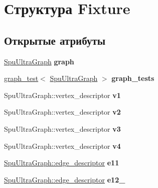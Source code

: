 \hypertarget{struct_fixture}{}\section{Структура Fixture}
\label{struct_fixture}
\subsection*{Открытые атрибуты}
\begin{DoxyCompactItemize}
\item 
\mbox{\label{struct_fixture_a13638f842ef2a8714421ebe71ba98a39}} 
\hyperlink{class_s_p_u___g_r_a_p_h_1_1_spu_ultra_graph}{Spu\+Ultra\+Graph} {\bfseries graph}
\item 
\mbox{\label{struct_fixture_a34b974dcb43215b8dfbc776ecccebc9c}} 
\hyperlink{structboost_1_1graph__test}{graph\+\_\+test}$<$ \hyperlink{class_s_p_u___g_r_a_p_h_1_1_spu_ultra_graph}{Spu\+Ultra\+Graph} $>$ {\bfseries graph\+\_\+tests}
\item 
\mbox{\label{struct_fixture_a27efb5204a9c0630f2f5371ed3492943}} 
Spu\+Ultra\+Graph\+::vertex\+\_\+descriptor {\bfseries v1}
\item 
\mbox{\label{struct_fixture_a574b245731c52555d692fa0c131489e2}} 
Spu\+Ultra\+Graph\+::vertex\+\_\+descriptor {\bfseries v2}
\item 
\mbox{\label{struct_fixture_a2f6bbeb63ad01ed7bf7daddd4c73a642}} 
Spu\+Ultra\+Graph\+::vertex\+\_\+descriptor {\bfseries v3}
\item 
\mbox{\label{struct_fixture_a14f9d6ac754e374afc2bd033b052f8ba}} 
Spu\+Ultra\+Graph\+::vertex\+\_\+descriptor {\bfseries v4}
\item 
\mbox{\label{struct_fixture_af62f86e186965f464151593a98320f0d}} 
\hyperlink{class_s_p_u___g_r_a_p_h_1_1_spu_ultra_graph_a5f3776e003ef0a1648f1d9f84289810b}{Spu\+Ultra\+Graph\+::edge\+\_\+descriptor} {\bfseries e11}
\item 
\mbox{\label{struct_fixture_a06aca3fe72ad21faab56f183ecbdd17c}} 
\hyperlink{class_s_p_u___g_r_a_p_h_1_1_spu_ultra_graph_a5f3776e003ef0a1648f1d9f84289810b}{Spu\+Ultra\+Graph\+::edge\+\_\+descriptor} {\bfseries e12\+\_}

\end{DoxyCompactItemize}
